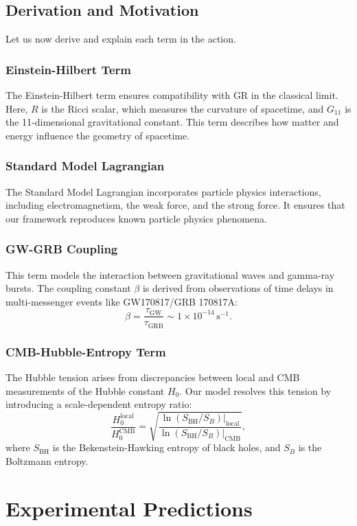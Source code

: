 \documentclass[12pt,a4paper]{article}
\begin{document}
\subsection{Derivation and Motivation}
Let us now derive and explain each term in the action.

\subsubsection{Einstein-Hilbert Term}
The Einstein-Hilbert term ensures compatibility with GR in the classical limit. Here, $R$ is the Ricci scalar, which measures the curvature of spacetime, and $G_{11}$ is the 11-dimensional gravitational constant. This term describes how matter and energy influence the geometry of spacetime.

\subsubsection{Standard Model Lagrangian}
The Standard Model Lagrangian incorporates particle physics interactions, including electromagnetism, the weak force, and the strong force. It ensures that our framework reproduces known particle physics phenomena.

\subsubsection{GW-GRB Coupling}
This term models the interaction between gravitational waves and gamma-ray bursts. The coupling constant $\beta$ is derived from observations of time delays in multi-messenger events like GW170817/GRB 170817A:
\[
\beta = \frac{\tau_{\text{GW}}}{\tau_{\text{GRB}}} \sim 1 \times 10^{-14} \, \text{s}^{-1}.
\]

\subsubsection{CMB-Hubble-Entropy Term}
The Hubble tension arises from discrepancies between local and CMB measurements of the Hubble constant $H_0$. Our model resolves this tension by introducing a scale-dependent entropy ratio:
\[
\frac{H_0^{\text{local}}}{H_0^{\text{CMB}}} = \sqrt{\frac{\ln(S_{\text{BH}} / S_B)|_{\text{local}}}{\ln(S_{\text{BH}} / S_B)|_{\text{CMB}}}},
\]
where $S_{\text{BH}}$ is the Bekenstein-Hawking entropy of black holes, and $S_B$ is the Boltzmann entropy.

\section{Experimental Predictions}
\end{document}
